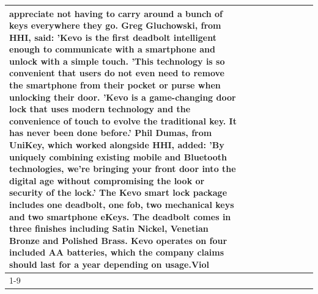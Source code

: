 \begin{table}[H]
\begin{tabular}{lllrlllll}
appreciate not having to carry around a bunch of keys everywhere they go. Greg Gluchowski, from HHI, said: 'Kevo is the first deadbolt intelligent enough to communicate with a smartphone and unlock with a simple touch. 'This technology is so convenient that users do not even need to remove the smartphone from their pocket or purse when unlocking their door. 'Kevo is a game-changing door lock that uses modern technology and the convenience of touch to evolve the traditional key. It has never been done before.' Phil Dumas, from UniKey, which worked alongside HHI, added: 'By uniquely combining existing mobile and Bluetooth technologies, we’re bringing your front door into the digital age without compromising the look or security of the lock.' The Kevo smart lock package includes one deadbolt, one fob, two mechanical keys and two smartphone eKeys. The deadbolt comes in three finishes including Satin Nickel, Venetian Bronze and Polished Brass. Kevo operates on four included AA batteries, which the company claims should last for a year depending on usage.Viol \\
\cline{1-9}

\end{tabular}
\end{table}
